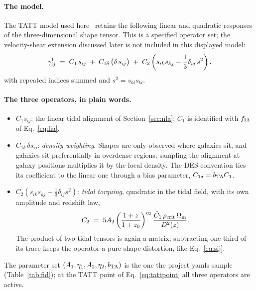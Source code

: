 \documentclass[11pt]{article}
\numberwithin{equation}{section}
\begin{document}
\paragraph{The model.}
The TATT model used here~\cite{Blazek} retains the following
linear and quadratic responses of the three-dimensional shape tensor.
This is a specified operator set; the velocity-shear extension discussed
later is not included in this displayed model:
\begin{equation}
  \gamma^{\rm I}_{ij}
  \;=\;
  C_1\, s_{ij}
  \;+\;
  C_{1\delta}\, \bigl(\delta\, s_{ij}\bigr)
  \;+\;
  C_2 \left(s_{ik} s_{kj}
  - \frac{1}{3}\delta_{ij}\, s^2\right) ,
  \label{eq:tattdef}
\end{equation}
with repeated indices summed and $s^2 = s_{kl}s_{kl}$.

\paragraph{The three operators, in plain words.}
\begin{itemize}
  \item $C_1 s_{ij}$: the linear tidal alignment of
    Section~\ref{sec:nla}; $C_1$ is identified with
    $f_{\rm IA}$ of Eq.~\eqref{eq:fia}.
  \item $C_{1\delta}\,\delta s_{ij}$: \emph{density weighting}.
    Shapes are only observed where galaxies sit, and galaxies sit
    preferentially in overdense regions; sampling the alignment at
    galaxy positions multiplies it by the local density.  The DES
    convention ties its coefficient to the linear one through a bias
    parameter, $C_{1\delta} = b_{\rm TA} C_1$.
  \item $C_2 (s_{ik}s_{kj} - \tfrac13\delta_{ij}s^2)$: \emph{tidal
    torquing}, quadratic in the tidal field, with its own amplitude
    and redshift law,
    \begin{equation}
      C_2 \;=\; 5 A_2
      \left(\frac{1+z}{1+z_0}\right)^{\eta_2}
      \frac{\bar C_1\, \rho_{\rm crit}\, \Omega_{\rm m}}{D^2(z)} .
      \label{eq:c2law}
    \end{equation}
    The product of two tidal tensors is again a matrix; subtracting
    one third of its trace keeps the operator a pure shape
    distortion, like Eq.~\eqref{eq:sij}.
\end{itemize}
The parameter set $(A_1, \eta_1, A_2, \eta_2, b_{\rm TA})$ is the
one the project yamls sample (Table~\ref{tab:fid}); at the TATT
point of Eq.~\eqref{eq:tattpoint} all three operators are active.
\end{document}
